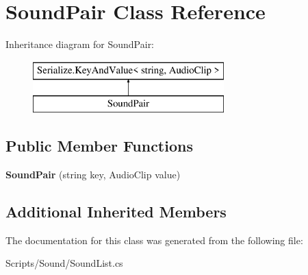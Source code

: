 \hypertarget{class_sound_pair}{}\section{Sound\+Pair Class Reference}
\label{class_sound_pair}
Inheritance diagram for Sound\+Pair\+:\begin{figure}[H]
\begin{center}
\leavevmode
\includegraphics[height=2.000000cm]{class_sound_pair}
\end{center}
\end{figure}
\subsection*{Public Member Functions}
\begin{DoxyCompactItemize}
\item 
{\bfseries Sound\+Pair} (string key, Audio\+Clip value)\hypertarget{class_sound_pair_acfc4e92a4f017d56a6c1f05c32641c53}{}\label{class_sound_pair_acfc4e92a4f017d56a6c1f05c32641c53}

\end{DoxyCompactItemize}
\subsection*{Additional Inherited Members}


The documentation for this class was generated from the following file\+:\begin{DoxyCompactItemize}
\item 
Scripts/\+Sound/Sound\+List.\+cs\end{DoxyCompactItemize}
